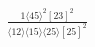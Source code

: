 \documentclass[varwidth, border=5pt]{standalone}
\begin{document}
\begin{my}
$\begin{gathered}
\scriptscriptstyle\frac{1⟨45⟩^2[23]^2}{⟨12⟩⟨15⟩⟨25⟩[25]^2}
\end{gathered}$
\end{my}
\end{document}
